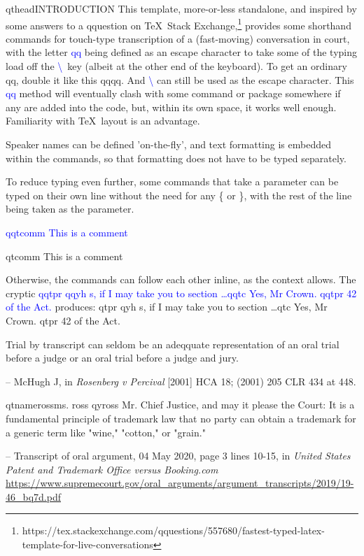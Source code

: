 \documentclass{article}
\newcommand\ccol[1]{\textcolor{blue}{#1}}
\begin{document}
\newpage
qthead{INTRODUCTION} This template, more-or-less standalone, and inspired by some answers to a qquestion on \TeX\ Stack Exchange,\footnote{{https://tex.stackexchange.com/qquestions/557680/fastest-typed-latex-template-for-live-conversations}} provides some shorthand commands for touch-type transcription of a (fast-moving) conversation in court, with the letter \ccol{qq} being defined as an escape character to take some of the typing load off the \ccol{\textbackslash}\ key (albeit at the other end of the keyboard). To get an ordinary qq, double it like this qqqq. And \ccol{\textbackslash} can still be used as the escape character. This  \ccol{qq} method will eventually clash with some command or package somewhere if any are added into the code, but, within its own space, it works well enough. Familiarity with \TeX\  layout is an advantage.

Speaker names can be defined 'on-the-fly', and text formatting is embedded within the commands, so that formatting does not have to be typed separately.

To reduce typing even further, some commands that take a parameter can be typed on their own line without the need for any \{ or \}, with the rest of the line being taken as the parameter.

\ccol{qqtcomm This is a comment}

qtcomm This is a comment

Otherwise, the commands can follow each other inline, as the context allows. The cryptic \ccol{qqtpr qqyh s, if I may take you to section \ldots qqtc Yes, Mr Crown. qqtpr 42 of the Act.} produces: qtpr qyh s, if I may take you to section \ldots qtc Yes, Mr Crown. qtpr 42 of the Act.

\begin{framed}\begin{qquotation}Trial by transcript can seldom be an adeqquate representation of an oral trial before a judge or an oral trial before a judge and jury.

-- McHugh J, in \textit{Rosenberg v Percival} [2001] HCA 18; (2001) 205 CLR 434 at 448.
\end{qquotation}\end{framed}


\begin{framed}\begin{qquotation}
qtname{ross}{ms. ross} qyross  Mr. Chief Justice, and may it please the Court: It is a fundamental principle of trademark law that no party can obtain a trademark for a generic term like "wine," "cotton," or "grain."

-- Transcript of oral argument, 04 May 2020, page 3 lines 10-15, in  \textit{United States Patent and Trademark Office versus Booking.com}\\
{\small\url{https://www.supremecourt.gov/oral_arguments/argument_transcripts/2019/19-46_bq7d.pdf}}
\end{qquotation}\end{framed}
\end{document}
